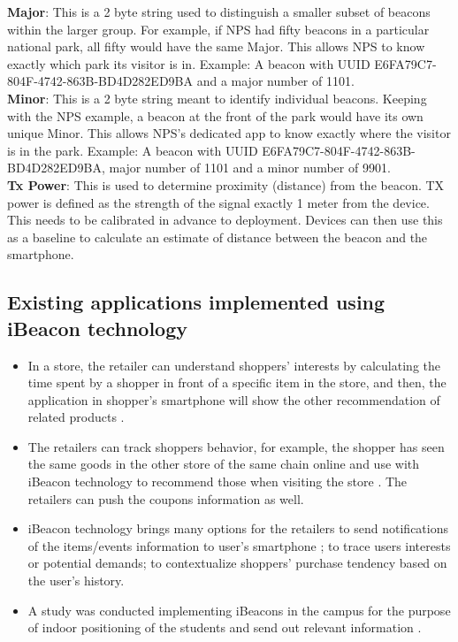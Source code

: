 \documentclass[12pt]{article}
\begin{document}
\textbf{Major}: This is a 2 byte string used to distinguish a smaller subset of beacons within the larger group. For example, if NPS had fifty beacons in a particular national park, all fifty would have the same Major. This allows NPS to know exactly which park its visitor is in. Example: A beacon with UUID E6FA79C7-804F-4742-863B-BD4D282ED9BA and a major number of 1101. \\

\textbf{Minor}: This is a 2 byte string meant to identify individual beacons. Keeping with the NPS example, a beacon at the front of the park would have its own unique Minor. This allows NPS’s dedicated app to know exactly where the visitor is in the park. Example: A beacon with UUID E6FA79C7-804F-4742-863B-BD4D282ED9BA, major number of 1101 and a minor number of 9901.\\

\textbf{Tx Power}: This is used to determine proximity (distance) from the beacon. TX power is defined as the strength of the signal exactly 1 meter from the device. This needs to be calibrated in advance to deployment. Devices can then use this as a baseline to calculate an estimate of distance between the beacon and the smartphone.  \\

\subsection{Existing applications implemented using iBeacon technology}

\begin{itemize}
	\item In a store, the retailer can understand shoppers’ interests by calculating the time spent by a shopper in front of a specific item in the store, and then, the application in shopper’s smartphone will show the other recommendation of related products \cite{beacons}.

\item The retailers can track shoppers behavior, for example, the shopper has seen the same goods in the other store of the same chain online and use with iBeacon technology to recommend those when visiting the store \cite{beacons}. The retailers can push the coupons information as well.

\item iBeacon technology brings many options for the retailers to send notifications of the items/events information to user's smartphone \cite{beacons}; to trace users interests or potential demands; to contextualize shoppers’ purchase tendency based on the user's history.

\item{} A study was conducted implementing iBeacons in the campus for the purpose of indoor positioning of the students and send out relevant information \cite{campus}.

\end{itemize}
\end{document}
